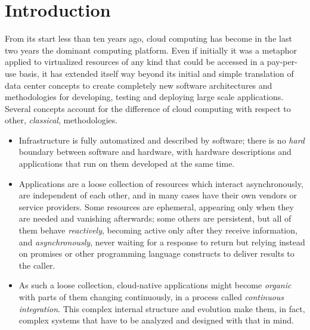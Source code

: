 \documentclass[utf8]{frontiersSCNS} %
\begin{document}
\section{Introduction}

From its start less than ten years ago, cloud computing
\citep{qian2009cloud,armbrust2010view,Sadiku2014} has become in the last two
years the dominant computing platform. Even if initially it was a
metaphor applied to virtualized resources of any kind that could be
accessed in a pay-per-use basis, it has extended itself way beyond its
initial and simple translation of data center concepts to create
completely new software architectures and methodologies for
developing, testing and deploying large scale applications. Several
concepts account for the difference of cloud computing with respect
to other, {\em classical}, methodologies. %


\begin{itemize}

\item Infrastructure is fully automatized and described by software;
  there is no {\em hard} boundary between software and hardware, with
  hardware descriptions and applications that run on them
  developed at the same time.

\item Applications are a loose collection of resources which interact
  asynchronously, are independent of each other, and in many cases
  have their own vendors or service providers. Some resources are
  ephemeral, appearing only when they are needed and vanishing afterwards;
  some others are persistent, but all of them behave {\em reactively},
  becoming active only after %
  they receive information, and {\em asynchronously}, never waiting for a
  response to return but relying instead on promises or other
  programming language constructs to deliver results to the caller.

\item  As such a loose collection, cloud-native applications might
  become {\em organic} with parts of them changing continuously, in a
  process called {\em continuous integration}. This complex internal
  structure and evolution make them, in fact, complex systems that
  have to be analyzed and designed with that in mind.
\end{itemize}
\end{document}
